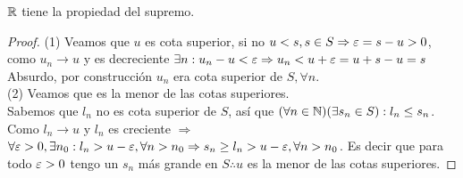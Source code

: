 \begin{theorem}
	\(\mathbb{R} \) tiene la propiedad del supremo.
	\begin{proof}
		(1) Veamos que \(u\) es cota superior, si no \(u < s, s \in S \Rightarrow \varepsilon = s - u > 0\), como \(u_n \to u\) y es decreciente \(\exists n : u_n - u < \varepsilon \Rightarrow u_n < u + \varepsilon = u + s - u = s\) Absurdo, por construcción \(u_n\) era cota superior de \(S, \forall n\). \\

		(2) Veamos que es la menor de las cotas superiores. \\
		Sabemos que \(l_n\) no es cota superior de \(S\), así que \((\forall n \in \mathbb{N})(\exists s_n \in S) : l_n \leq s_n\). Como \(l_n \to u\) y \(l_n\) es creciente \(\Rightarrow \) \\
		\(\forall \varepsilon > 0, \exists n_0 : l_n > u - \varepsilon, \forall n>n_0 \Rightarrow s_n \geq l_n > u - \varepsilon, \forall n > n_0\). Es decir que para todo \(\varepsilon > 0\) tengo un \(s_n\) más grande en \(S \therefore u\) es la menor de las cotas superiores.
	\end{proof}
\end{theorem}

